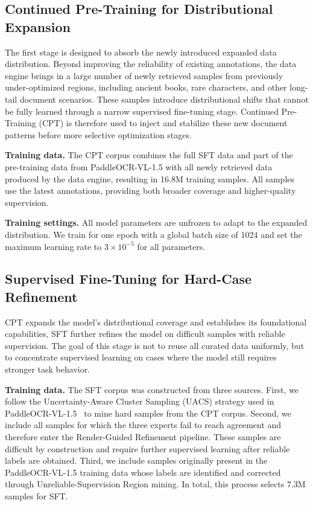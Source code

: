 \documentclass[11pt, a4paper,logo,  copyright, nonumbering]{paddleocr}
\begin{document}
\subsection{Continued Pre-Training for Distributional Expansion}
\label{training_strategy_cpt}

The first stage is designed to absorb the newly introduced expanded data distribution. Beyond improving the reliability of existing annotations, the data engine brings in a large number of newly retrieved samples from previously under-optimized regions, including ancient books, rare characters, and other long-tail document scenarios. These samples introduce distributional shifts that cannot be fully learned through a narrow supervised fine-tuning stage. Continued Pre-Training (CPT) is therefore used to inject and stabilize these new document patterns before more selective optimization stages. 

\textbf{Training data.} The CPT corpus combines the full SFT data and part of the pre-training data from PaddleOCR-VL-1.5 with all newly retrieved data produced by the data engine, resulting in 16.8M training samples. All samples use the latest annotations, providing both broader coverage and higher-quality supervision.

\textbf{Training settings.} All model parameters are unfrozen to adapt to the expanded distribution. We train for one epoch with a global batch size of 1024 and set the maximum learning rate to $3\times10^{-5}$ for all parameters.

\subsection{Supervised Fine-Tuning for Hard-Case Refinement}
\label{training_strategy_sft}
CPT expands the model's distributional coverage and establishes its foundational capabilities, SFT further refines the model on difficult samples with reliable supervision. The goal of this stage is not to reuse all curated data uniformly, but to concentrate supervised learning on cases where the model still requires stronger task behavior.

\textbf{Training data.} The SFT corpus was constructed from three sources. First, we follow the Uncertainty-Aware Cluster Sampling (UACS) strategy used in PaddleOCR-VL-1.5~\cite{cui2026paddleocr} to mine hard samples from the CPT corpus. Second, we include all samples for which the three experts fail to reach agreement and therefore enter the Render-Guided Refinement pipeline. These samples are difficult by construction and require further supervised learning after reliable labels are obtained. Third, we include samples originally present in the PaddleOCR-VL-1.5 training data whose labels are identified and corrected through Unreliable-Supervision Region mining. In total, this process selects 7.3M samples for SFT.
\end{document}
